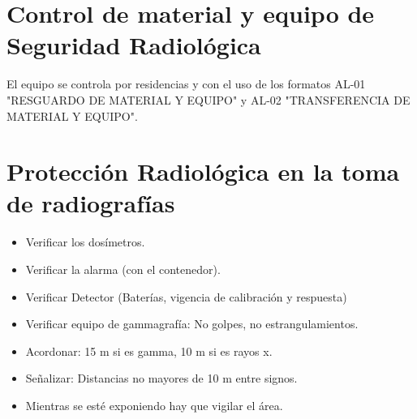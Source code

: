 \section*{Control de material y equipo de Seguridad Radiológica}
El equipo se controla por residencias y con el uso de los formatos AL-01 "RESGUARDO DE MATERIAL Y EQUIPO" y AL-02 "TRANSFERENCIA DE MATERIAL Y EQUIPO".

\section*{Protección Radiológica en la toma de radiografías}
\begin{itemize}
    \item Verificar los dosímetros.
    \item Verificar la alarma (con el contenedor).
    \item Verificar Detector (Baterías, vigencia de calibración y respuesta)
    \item Verificar equipo de gammagrafía: No golpes, no estrangulamientos.
    \item Acordonar: 15 m si es gamma, 10 m si es rayos x.
    \item Señalizar: Distancias no mayores de 10 m entre signos.
    \item Mientras se esté exponiendo hay que vigilar el área.
\end{itemize}
